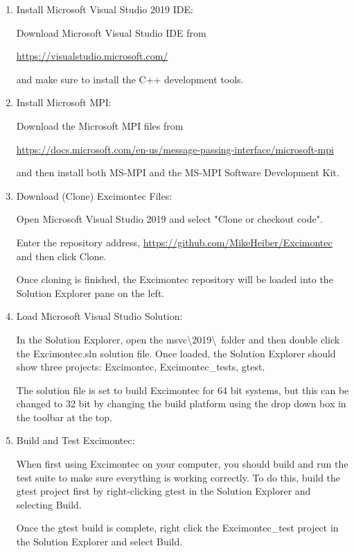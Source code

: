 \documentclass[%
 reprint,onecolumn,notitlepage,
superscriptaddress,longbibliography,
 amsmath,amssymb,
 aps,rmp,floatfix,
]{revtex4-1}
\begin{document}
\begin{enumerate}

\item Install Microsoft Visual Studio 2019 IDE:
    
Download Microsoft Visual Studio IDE from

\url{https://visualstudio.microsoft.com/}

and make sure to install the C++ development tools.

\item Install Microsoft MPI:

Download the Microsoft MPI files from
    
\url{https://docs.microsoft.com/en-us/message-passing-interface/microsoft-mpi}
    
and then install both MS-MPI and the MS-MPI Software Development Kit.

\item Download (Clone) Excimontec Files:

Open Microsoft Visual Studio 2019 and select "Clone or checkout code".

Enter the repository address,
\url{https://github.com/MikeHeiber/Excimontec}
and then click Clone.

Once cloning is finished, the Excimontec repository will be loaded into the Solution Explorer pane on the left.

\item Load Microsoft Visual Studio Solution:

In the Solution Explorer, open the msvc\textbackslash 2019\textbackslash\ folder and then double click the Excimontec.sln solution file.
Once loaded, the Solution Explorer should show three projects: Excimontec, Excimontec\_tests, gtest.

The solution file is set to build Excimontec for 64 bit systems, but this can be changed to 32 bit by changing the build platform using the drop down box in the toolbar at the top.

\item Build and Test Excimontec:

When first using Excimontec on your computer, you should build and run the test suite to make sure everything is working correctly.
To do this, build the gtest project first by right-clicking gtest in the Solution Explorer and selecting Build.

Once the gtest build is complete, right click the Excimontec\_test project in the Solution Explorer and select Build. 


\end{enumerate}
\end{document}
